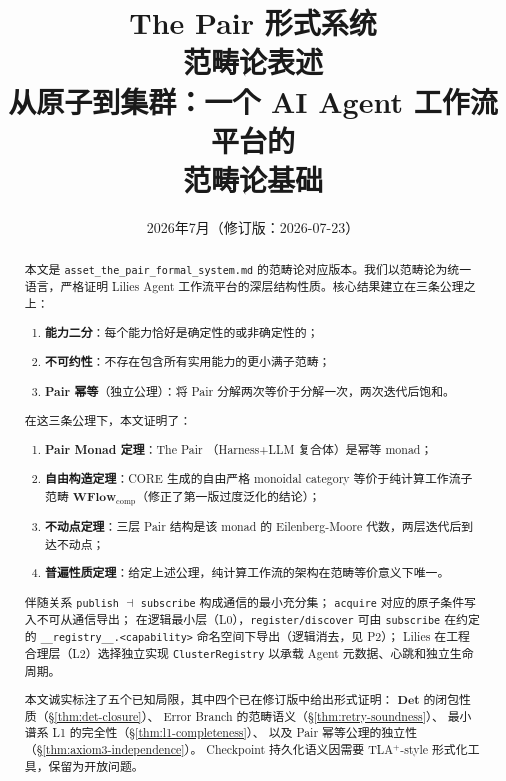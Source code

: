\documentclass[11pt,a4paper]{article}
\title{
    {\Huge The Pair 形式系统} \\[0.3cm]
    {\large 范畴论表述} \\[0.5cm]
    {\normalsize 从原子到集群：一个 AI Agent 工作流平台的 \\
                   范畴论基础}
}
\author{
    \small 2026年7月\quad（修订版：2026-07-23）
}
\date{}
\theoremstyle{definition}
\theoremstyle{definition}
\theoremstyle{remark}
\newcommand{\cat}[1]{\mathbf{#1}}
\newcommand{\catWFlow}{\cat{WFlow}}
\newcommand{\catDet}{\cat{Det}}
\newcommand{\adjunction}{\dashv}
\begin{document}
\maketitle

\begin{abstract}
本文是 \texttt{asset\_the\_pair\_formal\_system.md} 的范畴论对应版本。我们以范畴论为统一语言，严格证明 Lilies Agent 工作流平台的深层结构性质。核心结果建立在三条公理之上：

\begin{enumerate}[leftmargin=2em,label=(\arabic*)]
    \item \textbf{能力二分}：每个能力恰好是确定性的或非确定性的；
    \item \textbf{不可约性}：不存在包含所有实用能力的更小满子范畴；
    \item \textbf{Pair 幂等}（独立公理）：将 Pair 分解两次等价于分解一次，两次迭代后饱和。
\end{enumerate}

在这三条公理下，本文证明了：
\begin{enumerate}[leftmargin=2em,label=(\arabic*)]
    \item \textbf{Pair Monad 定理}：The Pair （Harness+LLM 复合体）是幂等 monad；
    \item \textbf{自由构造定理}：CORE 生成的自由严格 monoidal category 等价于纯计算工作流子范畴 $\catWFlow_{\mathrm{comp}}$（修正了第一版过度泛化的结论）；
    \item \textbf{不动点定理}：三层 Pair 结构是该 monad 的 Eilenberg-Moore 代数，两层迭代后到达不动点；
    \item \textbf{普遍性质定理}：给定上述公理，纯计算工作流的架构在范畴等价意义下唯一。
\end{enumerate}

伴随关系 \texttt{publish} $\adjunction$ \texttt{subscribe} 构成通信的最小充分集；
\texttt{acquire} 对应的原子条件写入不可从通信导出；
在逻辑最小层（L0），\texttt{register/discover} 可由 \texttt{subscribe} 在约定的 \texttt{\_\_registry\_\_.<capability>} 命名空间下导出（逻辑消去，见 P2）；
Lilies 在工程合理层（L2）选择独立实现 \texttt{ClusterRegistry} 以承载 Agent 元数据、心跳和独立生命周期。

本文诚实标注了五个已知局限，其中四个已在修订版中给出形式证明：
$\catDet$ 的闭包性质（\S\ref{thm:det-closure}）、
Error Branch 的范畴语义（\S\ref{thm:retry-soundness}）、
最小谱系 L1 的完全性（\S\ref{thm:l1-completeness}）、
以及 Pair 幂等公理的独立性（\S\ref{thm:axiom3-independence}）。
Checkpoint 持久化语义因需要 TLA$^{+}$-style 形式化工具，保留为开放问题。
\end{abstract}
\end{document}
